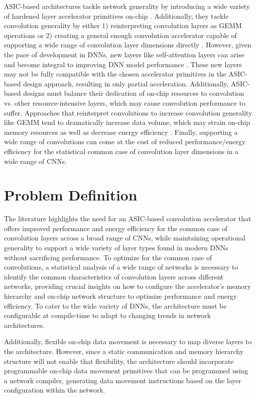 ASIC-based architectures tackle network generality by introducing a wide variety
of hardened layer accelerator primitives on-chip \cite{tpu}. Additionally, they
tackle convolution generality by either 1) reinterpreting convolution layers as
GEMM operations or 2) creating a general enough convolution accelerator capable
of supporting a wide range of convolution layer dimensions directly
\cite{eyerissv2}. However, given the pace of development in DNNs, new layers
like self-attention layers \cite{transformer_model} can arise and become
integral to improving DNN model performance \cite{conv_and_transformers}. These
new layers may not be fully compatible with the chosen accelerator primitives in
the ASIC-based design approach, resulting in only partial acceleration.
Additionally, ASIC-based designs must balance their dedication of on-chip
resources to convolution vs. other resource-intensive layers, which may cause
convolution performance to suffer. Approaches that reinterpret convolutions to
increase convolution generality like GEMM tend to dramatically increase data
volume, which may strain on-chip memory resources as well as decrease energy
efficiency \cite{caffeine}. Finally, supporting a wide range of convolutions can
come at the cost of reduced performance/energy efficiency for the statistical
common case of convolution layer dimensions in a wide range of CNNs.

\section{Problem Definition}
\label{chap:intro:prob_def}

The literature highlights the need for an ASIC-based convolution accelerator
that offers improved performance and energy efficiency for the common case of
convolution layers across a broad range of CNNs, while maintaining operational
generality to support a wide variety of layer types found in modern DNNs without
sacrificing performance. To optimize for the common case of convolutions, a
statistical analysis of a wide range of networks is necessary to identify the
common characteristics of convolution layers across different networks,
providing crucial insights on how to configure the accelerator's memory
hierarchy and on-chip network structure to optimize performance and energy
efficiency. To cater to the wide variety of DNNs, the architecture must be
configurable at compile-time to adapt to changing trends in network
architectures. 

Additionally, flexible on-chip data movement is necessary to map
diverse layers to the architecture. However, since a static communication and
memory hierarchy structure will not enable that flexibility, the architecture
should incorporate programmable on-chip data movement primitives that can be
programmed using a network compiler, generating data movement instructions based
on the layer configuration within the network. 

